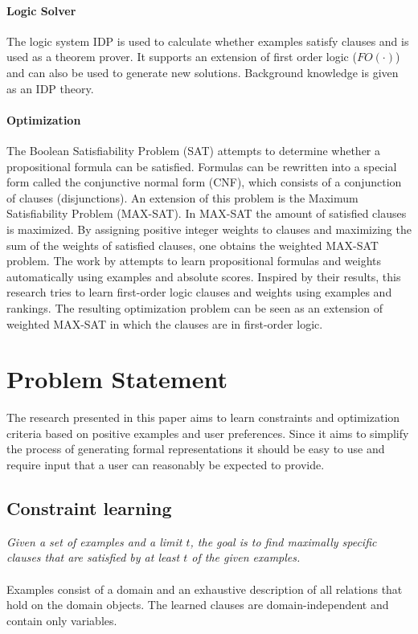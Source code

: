 \documentclass[letterpaper]{article}
\theoremstyle{definition}
\begin{document}
\paragraph{Logic Solver}
The logic system IDP \cite{de2013prototype,wittocx2008idp} is used to calculate whether examples satisfy clauses and is used as a theorem prover.
It supports an extension of first order logic ($FO(\cdot)$) and can also be used to generate new solutions.
Background knowledge is given as an IDP theory.

\paragraph{Optimization}
The Boolean Satisfiability Problem (SAT) attempts to determine whether a propositional formula can be satisfied.
Formulas can be rewritten into a special form called the conjunctive normal form (CNF), which consists of a conjunction of clauses (disjunctions).
An extension of this problem is the Maximum Satisfiability Problem (MAX-SAT).
In MAX-SAT the amount of satisfied clauses is maximized.
By assigning positive integer weights to clauses and maximizing the sum of the weights of satisfied clauses, one obtains the weighted MAX-SAT problem.
The work by \cite{campigotto2011active} attempts to learn propositional formulas and weights automatically using examples and absolute scores.
Inspired by their results, this research tries to learn first-order logic clauses and weights using examples and rankings.
The resulting optimization problem can be seen as an extension of weighted MAX-SAT in which the clauses are in first-order logic.


\section{Problem Statement}
The research presented in this paper aims to learn constraints and optimization criteria based on positive examples and user preferences.
Since it aims to simplify the process of generating formal representations it should be easy to use and require input that a user can reasonably be expected to provide.

\subsection{Constraint learning}
\emph{Given a set of examples and a limit $t$, the goal is to find maximally specific clauses that are satisfied by at least $t$ of the given examples.}
\\\\
Examples consist of a domain and an exhaustive description of all relations that hold on the domain objects.
The learned clauses are domain-independent and contain only variables.
\end{document}
